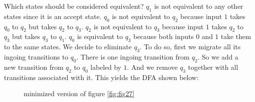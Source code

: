\documentclass[11pt]{article}
\begin{document}
Which states should be considered equivalent? $q_1$ is not equivalent
to any other states since it is an accept state. $q_0$ is not
equivalent to $q_2$ because input $1$ takes $q_0$ to $q_2$ but takes
$q_2$ to $q_3$. $q_2$ is not equivalent to $q_3$ because input $1$
takes $q_2$ to $q_3$ but takes $q_3$ to $q_1$. $q_0$ is equivalent to
$q_3$ because both inputs $0$ and $1$ take them to the same states.
We decide to eliminate $q_3$. To do so, first we migrate all its
ingoing transitions to $q_0$. There is one ingoing transition from $q_2$.
So we add a new transition from $q_2$ to $q_0$ labeled by $1$. And we
remove $q_3$ together with all transitions associated with it. This
yields the DFA shown below:

\begin{figure}[ht]
    \centering
    \caption{minimized version of figure \ref{fig:fig27}}
    \label{fig:fig28}
\end{figure}
\end{document}
